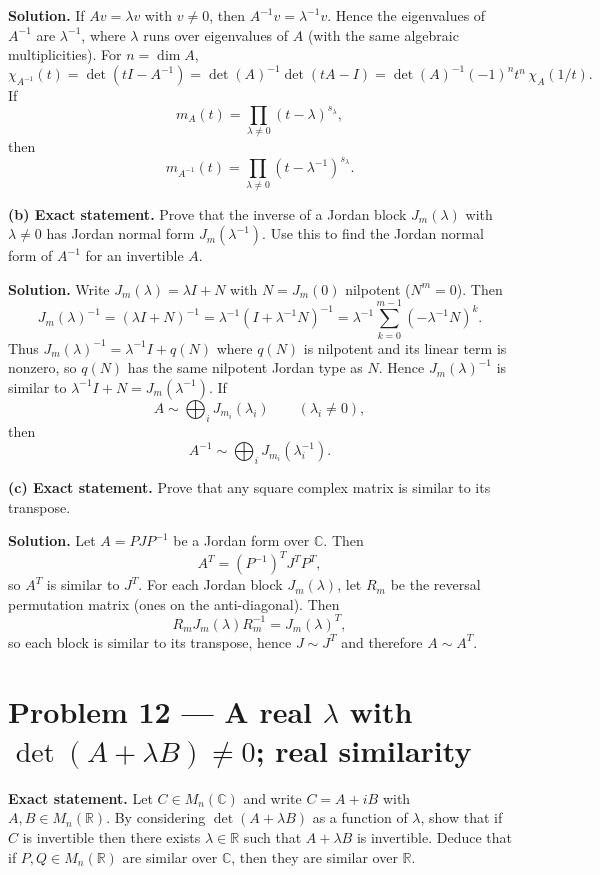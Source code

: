 \documentclass[12pt,a4paper]{article}
\theoremstyle{plain}
\theoremstyle{definition}      %
\begin{document}
\textbf{Solution.}
If $Av=\lambda v$ with $v\neq 0$, then $A^{-1}v=\lambda^{-1}v$. Hence the eigenvalues of $A^{-1}$ are $\lambda^{-1}$, where $\lambda$ runs over eigenvalues of $A$ (with the same algebraic multiplicities).
For $n=\dim A$,
\[
\chi_{A^{-1}}(t)=\det(tI-A^{-1})
=\det(A)^{-1}\det(tA-I)
=\det(A)^{-1}(-1)^n t^n\,\chi_A(1/t).
\]
If
\[
m_A(t)=\prod_{\lambda\neq 0}(t-\lambda)^{s_\lambda},
\]
then
\[
m_{A^{-1}}(t)=\prod_{\lambda\neq 0}(t-\lambda^{-1})^{s_\lambda}.
\]

\medskip
\textbf{(b) Exact statement.}
Prove that the inverse of a Jordan block $J_m(\lambda)$ with $\lambda\neq 0$ has Jordan normal form $J_m(\lambda^{-1})$.
Use this to find the Jordan normal form of $A^{-1}$ for an invertible $A$.

\textbf{Solution.}
Write $J_m(\lambda)=\lambda I+N$ with $N=J_m(0)$ nilpotent ($N^m=0$). Then
\[
J_m(\lambda)^{-1}
=(\lambda I+N)^{-1}
=\lambda^{-1}(I+\lambda^{-1}N)^{-1}
=\lambda^{-1}\sum_{k=0}^{m-1}(-\lambda^{-1}N)^k.
\]
Thus $J_m(\lambda)^{-1}=\lambda^{-1}I+q(N)$ where $q(N)$ is nilpotent and its linear term is nonzero, so $q(N)$ has the same nilpotent Jordan type as $N$.
Hence $J_m(\lambda)^{-1}$ is similar to $\lambda^{-1}I+N=J_m(\lambda^{-1})$.
If
\[
A\sim \bigoplus_i J_{m_i}(\lambda_i)\qquad(\lambda_i\neq 0),
\]
then
\[
A^{-1}\sim \bigoplus_i J_{m_i}(\lambda_i^{-1}).
\]

\medskip
\textbf{(c) Exact statement.}
Prove that any square complex matrix is similar to its transpose.

\textbf{Solution.}
Let $A=PJP^{-1}$ be a Jordan form over $\mathbb C$. Then
\[
A^T=(P^{-1})^T J^T P^T,
\]
so $A^T$ is similar to $J^T$. For each Jordan block $J_m(\lambda)$, let $R_m$ be the reversal permutation matrix (ones on the anti-diagonal). Then
\[
R_m J_m(\lambda) R_m^{-1}=J_m(\lambda)^T,
\]
so each block is similar to its transpose, hence $J\sim J^T$ and therefore $A\sim A^T$.

\section*{Problem 12 — A real $\lambda$ with $\det(A+\lambda B)\neq 0$; real similarity}

\textbf{Exact statement.}
Let $C\in M_n(\mathbb C)$ and write $C=A+iB$ with $A,B\in M_n(\mathbb R)$.
By considering $\det(A+\lambda B)$ as a function of $\lambda$, show that if $C$ is invertible then there exists $\lambda\in\mathbb R$ such that $A+\lambda B$ is invertible.
Deduce that if $P,Q\in M_n(\mathbb R)$ are similar over $\mathbb C$, then they are similar over $\mathbb R$.
\end{document}
